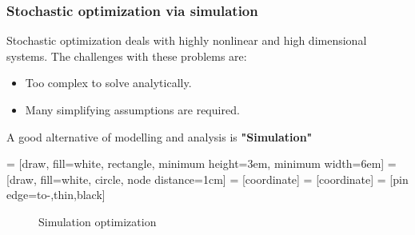 \begin{frame}
\frametitle{\centering  Stochastic optimization via simulation}
\begin{small}
\begin{block}{}
Stochastic optimization deals with  highly nonlinear and high dimensional systems. The challenges with these problems are:
\begin{itemize}
\item Too complex to solve analytically.
\item Many simplifying assumptions are  required.
\end{itemize}
\end{block}
\pause
\begin{block}{}
A good alternative of modelling and analysis is \textbf{"Simulation"}
\end{block}

\begin{block}{}
 = [draw, fill=white, rectangle,
   minimum height=3em, minimum width=6em]
 = [draw, fill=white, circle, node distance=1cm]
 = [coordinate]
 = [coordinate]
 = [pin edge={to-,thin,black}]

 \begin{figure}[t]
    \centering
{}
\caption{Simulation optimization}
\label{fig:so}
\end{figure}

\end{block}
\end{small}
\end{frame}




